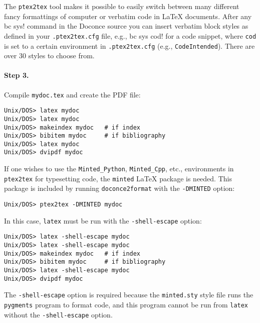 \documentclass{article}
\begin{document}
The {\fontsize{10pt}{10pt}\verb!ptex2tex!} tool makes it possible to easily switch between many
different fancy formattings of computer or verbatim code in {\LaTeX}
documents. After any {\fontsize{10pt}{10pt}\verb!!bc sys!} command in the Doconce source you can
insert verbatim block styles as defined in your {\fontsize{10pt}{10pt}\verb!.ptex2tex.cfg!}
file, e.g., {\fontsize{10pt}{10pt}\verb!!bc sys cod!} for a code snippet, where {\fontsize{10pt}{10pt}\verb!cod!} is set to
a certain environment in {\fontsize{10pt}{10pt}\verb!.ptex2tex.cfg!} (e.g., {\fontsize{10pt}{10pt}\verb!CodeIntended!}).
There are over 30 styles to choose from.

\paragraph{Step 3.}
Compile {\fontsize{10pt}{10pt}\verb!mydoc.tex!}
and create the PDF file:
\vspace{4pt}
\begin{Verbatim}[numbers=none,frame=lines,label=\fbox{{\tiny Terminal}},fontsize=\fontsize{9pt}{9pt},
labelposition=topline,framesep=2.5mm,framerule=0.7pt]
Unix/DOS> latex mydoc
Unix/DOS> latex mydoc
Unix/DOS> makeindex mydoc   # if index
Unix/DOS> bibitem mydoc     # if bibliography
Unix/DOS> latex mydoc
Unix/DOS> dvipdf mydoc
\end{Verbatim}
If one wishes to use the {\fontsize{10pt}{10pt}\verb!Minted_Python!}, {\fontsize{10pt}{10pt}\verb!Minted_Cpp!}, etc., environments
in {\fontsize{10pt}{10pt}\verb!ptex2tex!} for typesetting code, the {\fontsize{10pt}{10pt}\verb!minted!} {\LaTeX} package is needed.
This package is included by running {\fontsize{10pt}{10pt}\verb!doconce2format!} with the
{\fontsize{10pt}{10pt}\verb!-DMINTED!} option:
\vspace{4pt}
\begin{Verbatim}[numbers=none,frame=lines,label=\fbox{{\tiny Terminal}},fontsize=\fontsize{9pt}{9pt},
labelposition=topline,framesep=2.5mm,framerule=0.7pt]
Unix/DOS> ptex2tex -DMINTED mydoc
\end{Verbatim}
In this case, {\fontsize{10pt}{10pt}\verb!latex!} must be run with the
{\fontsize{10pt}{10pt}\verb!-shell-escape!} option:
\vspace{4pt}
\begin{Verbatim}[numbers=none,frame=lines,label=\fbox{{\tiny Terminal}},fontsize=\fontsize{9pt}{9pt},
labelposition=topline,framesep=2.5mm,framerule=0.7pt]
Unix/DOS> latex -shell-escape mydoc
Unix/DOS> latex -shell-escape mydoc
Unix/DOS> makeindex mydoc   # if index
Unix/DOS> bibitem mydoc     # if bibliography
Unix/DOS> latex -shell-escape mydoc
Unix/DOS> dvipdf mydoc
\end{Verbatim}
The {\fontsize{10pt}{10pt}\verb!-shell-escape!} option is required because the {\fontsize{10pt}{10pt}\verb!minted.sty!} style
file runs the {\fontsize{10pt}{10pt}\verb!pygments!} program to format code, and this program
cannot be run from {\fontsize{10pt}{10pt}\verb!latex!} without the {\fontsize{10pt}{10pt}\verb!-shell-escape!} option.
\end{document}
